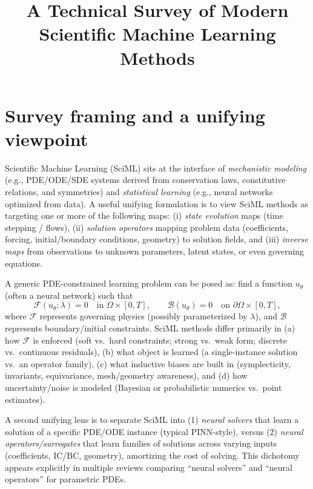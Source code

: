 \documentclass[11pt]{article}
\title{A Technical Survey of Modern Scientific Machine Learning Methods}
\author{}
\date{}
\begin{document}
\maketitle

\section{Survey framing and a unifying viewpoint}

Scientific Machine Learning (SciML) sits at the interface of \emph{mechanistic modeling} (e.g., PDE/ODE/SDE systems derived from conservation laws, constitutive relations, and symmetries) and \emph{statistical learning} (e.g., neural networks optimized from data). A useful unifying formulation is to view SciML methods as targeting one or more of the following maps: (i) \emph{state evolution} maps (time stepping / flows), (ii) \emph{solution operators} mapping problem data (coefficients, forcing, initial/boundary conditions, geometry) to solution fields, and (iii) \emph{inverse maps} from observations to unknown parameters, latent states, or even governing equations.

A generic PDE-constrained learning problem can be posed as: find a function $u_\theta$ (often a neural network) such that
\begin{equation}
\mathcal{F}(u_\theta; \lambda) = 0 \quad \text{in } \Omega\times [0,T], \qquad 
\mathcal{B}(u_\theta)=0 \quad \text{on } \partial\Omega\times[0,T],
    \end{equation}
    where $\mathcal{F}$ represents governing physics (possibly parameterized by $\lambda$), and $\mathcal{B}$ represents boundary/initial constraints. SciML methods differ primarily in (a) how $\mathcal{F}$ is enforced (soft vs.\ hard constraints; strong vs.\ weak form; discrete vs.\ continuous residuals), (b) what object is learned (a single-instance solution vs.\ an operator family), (c) what inductive biases are built in (symplecticity, invariants, equivariance, mesh/geometry awareness), and (d) how uncertainty/noise is modeled (Bayesian or probabilistic numerics vs.\ point estimates).

    A second unifying lens is to separate SciML into (1) \emph{neural solvers} that learn a solution of a specific PDE/ODE instance (typical PINN-style), versus (2) \emph{neural operators/surrogates} that learn families of solutions across varying inputs (coefficients, IC/BC, geometry), amortizing the cost of solving. This dichotomy appears explicitly in multiple reviews comparing ``neural solvers'' and ``neural operators'' for parametric PDEs.
\end{document}
